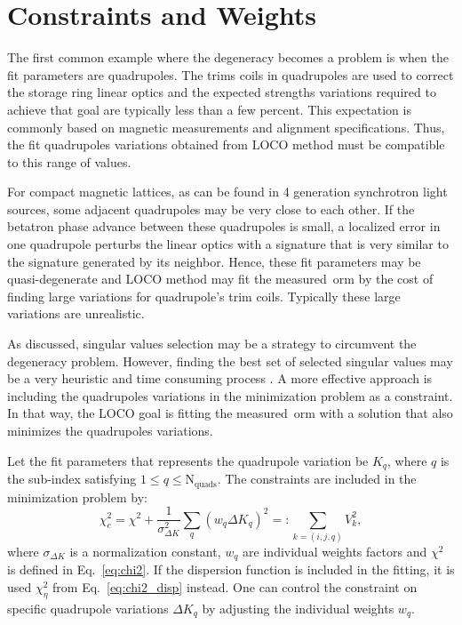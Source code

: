\section{Constraints and Weights}\label{sec:constraint}
The first common example where the degeneracy becomes a problem is when the fit parameters are quadrupoles. The trims coils in quadrupoles are used to correct the storage ring linear optics and the expected strengths variations required to achieve that goal are typically less than a few percent. This expectation is commonly based on magnetic measurements and alignment specifications. Thus, the fit quadrupoles variations obtained from LOCO method must be compatible to this range of values. 

For compact magnetic lattices, as can be found in 4 generation synchrotron light sources, some adjacent quadrupoles may be very close to each other. If the betatron phase advance between these quadrupoles is small, a localized error in one quadrupole perturbs the linear optics with a signature that is very similar to the signature generated by its neighbor. Hence, these fit parameters may be quasi-degenerate and LOCO method may fit the measured~\gls{orm} by the cost of finding large variations for quadrupole's trim coils. Typically these large variations are unrealistic.

As discussed, singular values selection may be a strategy to circumvent the degeneracy problem. However, finding the best set of selected singular values may be a very heuristic and time consuming process \cite{icfa_laurent}. A more effective approach is including the quadrupoles variations in the minimization problem as a constraint. In that way, the LOCO goal is fitting the measured~\gls{orm} with a solution that also minimizes the quadrupoles variations. 

Let the fit parameters that represents the quadrupole variation be $K_{q}$, where $q$ is the sub-index satisfying $1 \leq q \leq \mathrm{N}_{\mathrm{quads}}$. The constraints are included in the minimization problem by:
\begin{equation}
    \chi^2_{c} = \chi^2 + \dfrac{1}{\sigma_{\Delta K}^2}\sum_q \left(w_q \Delta K_q\right)^2 =: \sum_{{k = (i,j, q)}} V_{k}^2,
    \label{eq:chi2_constraint}
\end{equation}
where $\sigma_{\Delta K}$ is a normalization constant, $w_q$ are individual weights factors and $\chi^2$ is defined in Eq.~\eqref{eq:chi2}. If the dispersion function is included in the fitting, it is used $\chi^2_{\eta}$ from Eq.~\eqref{eq:chi2_disp} instead. One can control the constraint on specific quadrupole variations $\Delta K_q$ by adjusting the individual weights $w_q$.

